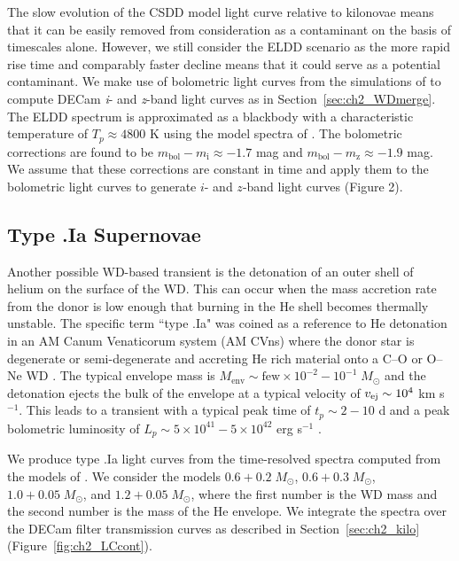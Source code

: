 The slow evolution of the CSDD model light curve relative to kilonovae means that it can be easily removed from consideration as a contaminant on the basis of timescales alone. However, we still consider the ELDD scenario as the more rapid rise time and comparably faster decline means that it could serve as a potential contaminant. We make use of bolometric light curves from the simulations of \citet{Sim+12} to compute DECam {\em i}- and {\em z}-band light curves as in Section~\ref{sec:ch2_WDmerge}. The ELDD spectrum is approximated as a blackbody with a characteristic temperature of $T_p \approx 4800$ K using the model spectra of \citet[see their Figure 7]{Sim+12}. The bolometric corrections are found to be $m_{\text{bol}} - m_{\text{i}} \approx -1.7$  mag and $m_{\text{bol}} - m_{\text{z}} \approx -1.9$ mag. We assume that these corrections are constant in time and apply them to the bolometric light curves to generate $i$- and $z$-band light curves (Figure 2).

\subsection{Type .Ia Supernovae}
\label{sec:ch2_type.Ia}
Another possible WD-based transient is the detonation of an outer shell of helium on the surface of the WD. This can occur when the mass accretion rate from the donor is low enough that burning in the He shell becomes thermally unstable. The specific term ``type .Ia" was coined as a reference to He detonation in an AM Canum Venaticorum system (AM CVns) where the donor star is degenerate or semi-degenerate and accreting He rich material onto a C--O or O--Ne WD \citet{Bildsten+07,Shen+10}. The typical envelope mass is $M_{\text{env}} \sim \text{few}\times10^{-2}-10^{-1}\;M_{\odot}$ and the detonation ejects the bulk of the envelope at a typical velocity of $v_{\rm ej} \sim 10^4$ km s$^{-1}$. This leads to a transient with a typical peak time of $t_p \sim 2-10$ d and a peak bolometric luminosity of $L_p \sim 5\times10^{41} - 5\times 10^{42}$ erg s$^{-1}$ \citep{Shen+10}.

We produce type .Ia light curves from the time-resolved spectra computed from the models of \citet{Shen+10}. We consider the models $0.6+0.2\;M_{\odot}$, $0.6+0.3\;M_{\odot}$, $1.0+0.05\;M_{\odot}$, and $1.2+0.05\;M_{\odot}$, where the first number is the WD mass and the second number is the mass of the He envelope. We integrate the spectra over the DECam filter transmission curves as described in Section~\ref{sec:ch2_kilo} (Figure~\ref{fig:ch2_LCcont}).


